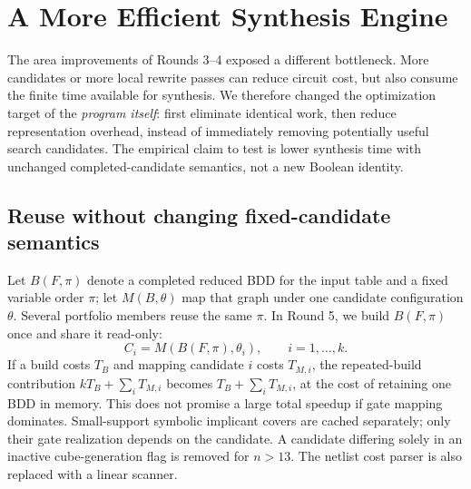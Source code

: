 \documentclass[journal,10pt]{IEEEtran}
\begin{document}
\section{A More Efficient Synthesis Engine}
The area improvements of Rounds 3--4 exposed a different bottleneck. More candidates or more local rewrite passes can reduce circuit cost, but also consume the finite time available for synthesis. We therefore changed the optimization target of the \emph{program itself}: first eliminate identical work, then reduce representation overhead, instead of immediately removing potentially useful search candidates. The empirical claim to test is lower synthesis time with unchanged completed-candidate semantics, not a new Boolean identity.
\subsection{Reuse without changing fixed-candidate semantics}
Let $B(F,\pi)$ denote a completed reduced BDD for the input table and a fixed variable order $\pi$; let $M(B,\theta)$ map that graph under one candidate configuration $\theta$. Several portfolio members reuse the same $\pi$. In Round 5, we build $B(F,\pi)$ once and share it read-only:
\begin{equation}
 C_i=M(B(F,\pi),\theta_i),\qquad i=1,\ldots,k.
\end{equation}
If a build costs $T_B$ and mapping candidate $i$ costs $T_{M,i}$, the repeated-build contribution $kT_B+\sum_iT_{M,i}$ becomes $T_B+\sum_iT_{M,i}$, at the cost of retaining one BDD in memory. This does not promise a large total speedup if gate mapping dominates. Small-support symbolic implicant covers are cached separately; only their gate realization depends on the candidate. A candidate differing solely in an inactive cube-generation flag is removed for $n>13$. The netlist cost parser is also replaced with a linear scanner.
\end{document}
